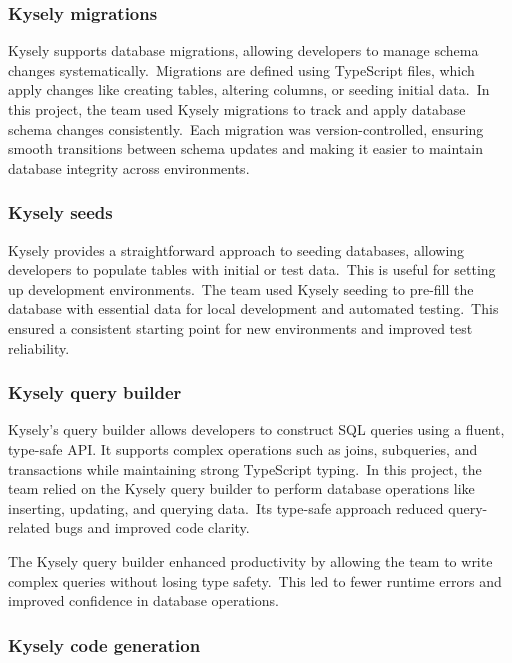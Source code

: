 \subsubsection{Kysely migrations}\label{subsubsec:kysely-migrations}

Kysely supports database migrations, allowing developers to manage schema changes systematically.\ Migrations are defined using TypeScript files, which apply changes like creating tables, altering columns, or seeding initial data.\ In this project, the team used Kysely migrations to track and apply database schema changes consistently.\ Each migration was version-controlled, ensuring smooth transitions between schema updates and making it easier to maintain database integrity across environments.

\subsubsection{Kysely seeds}\label{subsubsec:kysely-seeds}

Kysely provides a straightforward approach to seeding databases, allowing developers to populate tables with initial or test data.\ This is useful for setting up development environments.\ The team used Kysely seeding to pre-fill the database with essential data for local development and automated testing.\ This ensured a consistent starting point for new environments and improved test reliability.

\subsubsection{Kysely query builder}\label{subsubsec:kysely-query-builder}

Kysely's query builder allows developers to construct SQL queries using a fluent, type-safe API. It supports complex operations such as joins, subqueries, and transactions while maintaining strong TypeScript typing.\ In this project, the team relied on the Kysely query builder to perform database operations like inserting, updating, and querying data.\ Its type-safe approach reduced query-related bugs and improved code clarity.

The Kysely query builder enhanced productivity by allowing the team to write complex queries without losing type safety.\ This led to fewer runtime errors and improved confidence in database operations.

\subsubsection{Kysely code generation}\label{subsubsec:kysely-code-generation}

